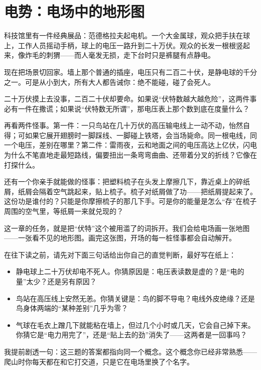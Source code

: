 \chapter{电势：电场中的地形图}


\begin{mainline}
科技馆里有一件经典展品：范德格拉夫起电机。一个大金属球，观众把手扶在球上，工作人员摇动手柄，球上的电压一路升到二十万伏。观众的长发一根根竖起来，像炸毛的刺猬——而人毫发无损，走下台时只是裤腿有点静电。

现在把场景切回家。墙上那个普通的插座，电压只有二百二十伏，是静电球的千分之一。可是从小到大，所有大人都告诫你：绝不能碰，碰了会死人。

二十万伏摸上去没事，二百二十伏却要命。如果说“伏特数越大越危险”，这两件事必有一件在撒谎；如果说“伏特数无所谓”，那电压表上那个数到底在度量什么？

再看两件怪事。第一件：一只鸟站在几十万伏的高压输电线上一动不动，怡然自得；可如果它展开翅膀时一脚踩线、一脚碰上铁塔，会当场毙命。同一根电线，同一个电压，差别在哪里？第二件：雷雨夜，云和地面之间的电压高达上亿伏，闪电为什么不笔直地走最短路线，偏要扭出一条弯弯曲曲、还带着分叉的折线？它像在打探什么。

还有一个你亲手就能做的怪事：把塑料梳子在头发上摩擦几下，靠近桌上的碎纸屑，纸屑会隔着空气跳起来，贴上梳子。梳子对纸屑做了功——把纸屑提起来了。这份功是谁付的？只能是你摩擦梳子的那几下手。可是你的能量是怎么“存”在梳子周围的空气里，等纸屑一来就兑现的？

这一章的任务，就是把“伏特”这个被用滥了的词拆开。我们会给电场画一张地图——一张看不见的地形图。画完这张图，开场的每一桩怪事都会自动解开。
\end{mainline}


\begin{mainline}
在往下读之前，请先对下面三句话给出你自己的直觉判断，最好写在纸上：

\begin{itemize}
  \item 静电球上二十万伏却电不死人。你猜原因是：电压表读数是虚的？是“电的量”太少？还是另有原因？
  \item 鸟站在高压线上安然无恙。你猜关键是：鸟的脚不导电？电线外皮绝缘？还是鸟身体两端的“某种差别”几乎为零？
  \item 气球在毛衣上蹭几下就能粘在墙上，但过几个小时或几天，它会自己掉下来。你猜它是“电力用完了”，还是“贴上去的劲”消失了——这两者是一回事吗？
\end{itemize}

我提前剧透一句：这三题的答案都指向同一个概念。这个概念你已经非常熟悉——爬山时你每天都在和它打交道，只是它在电场里换了个名字。
\end{mainline}

